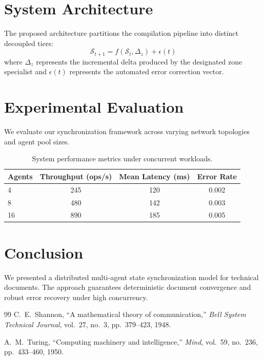 \documentclass[10pt,twocolumn]{article}
\begin{document}
\section{System Architecture}
\label{sec:arch}
The proposed architecture partitions the compilation pipeline into distinct decoupled tiers:
\begin{equation}
\label{eq:state}
\mathcal{S}_{t+1} = f(\mathcal{S}_t, \Delta_z) + \epsilon(t)
\end{equation}
where $\Delta_z$ represents the incremental delta produced by the designated zone specialist and $\epsilon(t)$ represents the automated error correction vector.

\section{Experimental Evaluation}
\label{sec:exp}
We evaluate our synchronization framework across varying network topologies and agent pool sizes.

\begin{table}[ht]
\centering
\caption{System performance metrics under concurrent workloads.}
\label{tab:eval}
\begin{tabular}{lccc}
\toprule
\textbf{Agents} & \textbf{Throughput (ops/s)} & \textbf{Mean Latency (ms)} & \textbf{Error Rate} \\
\midrule
4  & 245 & 120 & 0.002 \\
8  & 480 & 142 & 0.003 \\
16 & 890 & 185 & 0.005 \\
\bottomrule
\end{tabular}
\end{table}

\section{Conclusion}
\label{sec:conclusion}
We presented a distributed multi-agent state synchronization model for technical documents. The approach guarantees deterministic document convergence and robust error recovery under high concurrency.

\begin{thebibliography}{99}
C.~E.~Shannon, ``A mathematical theory of communication,'' \emph{Bell System Technical Journal}, vol.~27, no.~3, pp.~379--423, 1948.

A.~M.~Turing, ``Computing machinery and intelligence,'' \emph{Mind}, vol.~59, no.~236, pp.~433--460, 1950.
\end{thebibliography}
\end{document}
